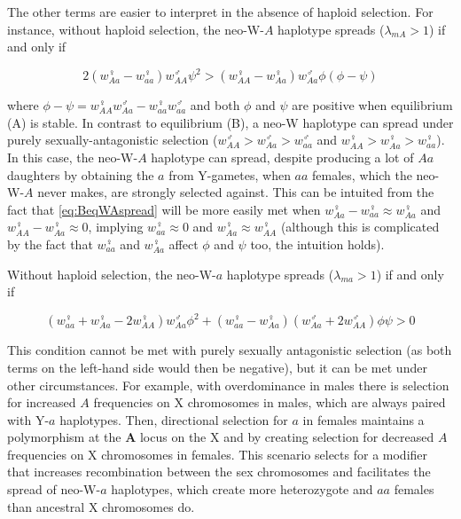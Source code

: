 \documentclass[12pt]{article}
\begin{document}
The other terms are easier to interpret in the absence of haploid selection.
For instance, without haploid selection, the neo-W-$A$ haplotype spreads ($\lambda_{mA}>1$) if and only if

\begin{equation}\label{eq:BeqWAspread}
2(w_{Aa}^\female-w_{aa}^\female)w_{AA}^\male \psi^2 > (w_{AA}^\female-w_{Aa}^\female)w_{Aa}^\male \phi (\phi-\psi)
\end{equation}

\noindent  
where $\phi-\psi=w_{AA}^\female w_{Aa}^\male-w_{aa}^\female w_{aa}^\male$ and both $\phi$ and $\psi$ are positive when equilibrium (A) is stable. 
In contrast to equilibrium (B), a neo-W haplotype can spread under purely sexually-antagonistic selection  ($w_{AA}^\male>w_{Aa}^\male>w_{aa}^\male$ and $w_{AA}^\female>w_{Aa}^\female>w_{aa}^\female$).
In this case, the neo-W-$A$ haplotype can spread, despite producing a lot of $Aa$ daughters by obtaining the $a$ from Y-gametes, when $aa$ females, which the neo-W-$A$ never makes, are strongly selected against.
This can be intuited from the fact that \eqref{eq:BeqWAspread} will be more easily met when $w_{Aa}^\female-w_{aa}^\female\approx w_{Aa}^\female$ and $w_{AA}^\female-w_{Aa}^\female\approx 0$, implying $w_{aa}^\female \approx 0$ and $w_{Aa}^\female\approx w_{AA}^\female$ (although this is complicated by the fact that $w_{aa}^\female$ and $w_{Aa}^\female$ affect $\phi$ and $\psi$ too, the intuition holds). 

Without haploid selection, the neo-W-$a$ haplotype spreads ($\lambda_{ma}>1$) if and only if

\begin{equation}\label{eq:BeqWaspread}
(w_{aa}^\female + w_{Aa}^\female-2w_{AA}^\female)w_{Aa}^\male \phi^2 + (w_{aa}^\female-w_{Aa}^\female)(w_{Aa}^\male+2w_{AA}^\male) \phi \psi >0
\end{equation}

\noindent
This condition cannot be met with purely sexually antagonistic selection (as both terms on the left-hand side would then be negative), but it can be met under other circumstances. 
For example, with overdominance in males there is selection for increased $A$ frequencies on X chromosomes in males, which are always paired with Y-$a$ haplotypes.
Then, directional selection for $a$ in females maintains a polymorphism at the $\textbf{A}$ locus on the X and by creating selection for decreased $A$ frequencies on X chromosomes in females.
This scenario selects for a modifier that increases recombination between the sex chromosomes \citep[e.g., blue region of Figure 2d in][]{Otto2014} and facilitates the spread of neo-W-$a$ haplotypes, which create more heterozygote and $aa$ females than ancestral X chromosomes do. 
\end{document}
